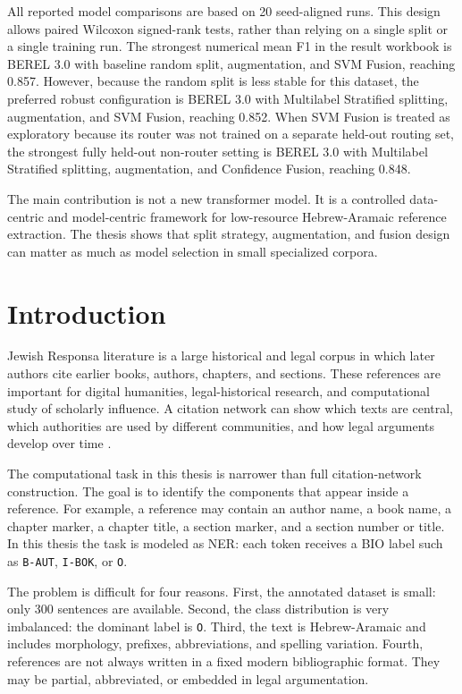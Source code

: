\documentclass[12pt,a4paper]{report}
\begin{document}
All reported model comparisons are based on 20 seed-aligned runs. This design allows paired Wilcoxon signed-rank tests, rather than relying on a single split or a single training run. The strongest numerical mean F1 in the result workbook is BEREL 3.0 with baseline random split, augmentation, and SVM Fusion, reaching 0.857. However, because the random split is less stable for this dataset, the preferred robust configuration is BEREL 3.0 with Multilabel Stratified splitting, augmentation, and SVM Fusion, reaching 0.852. When SVM Fusion is treated as exploratory because its router was not trained on a separate held-out routing set, the strongest fully held-out non-router setting is BEREL 3.0 with Multilabel Stratified splitting, augmentation, and Confidence Fusion, reaching 0.848.

The main contribution is not a new transformer model. It is a controlled data-centric and model-centric framework for low-resource Hebrew-Aramaic reference extraction. The thesis shows that split strategy, augmentation, and fusion design can matter as much as model selection in small specialized corpora.

\tableofcontents
\clearpage
{}

\chapter{Introduction}
Jewish Responsa literature is a large historical and legal corpus in which later authors cite earlier books, authors, chapters, and sections. These references are important for digital humanities, legal-historical research, and computational study of scholarly influence. A citation network can show which texts are central, which authorities are used by different communities, and how legal arguments develop over time \citep{satlow2022,bengigi2024viewpoint,bengigi2025}.

The computational task in this thesis is narrower than full citation-network construction. The goal is to identify the components that appear inside a reference. For example, a reference may contain an author name, a book name, a chapter marker, a chapter title, a section marker, and a section number or title. In this thesis the task is modeled as NER: each token receives a BIO label such as \texttt{B-AUT}, \texttt{I-BOK}, or \texttt{O}.

The problem is difficult for four reasons. First, the annotated dataset is small: only 300 sentences are available. Second, the class distribution is very imbalanced: the dominant label is \texttt{O}. Third, the text is Hebrew-Aramaic and includes morphology, prefixes, abbreviations, and spelling variation. Fourth, references are not always written in a fixed modern bibliographic format. They may be partial, abbreviated, or embedded in legal argumentation.
\end{document}
